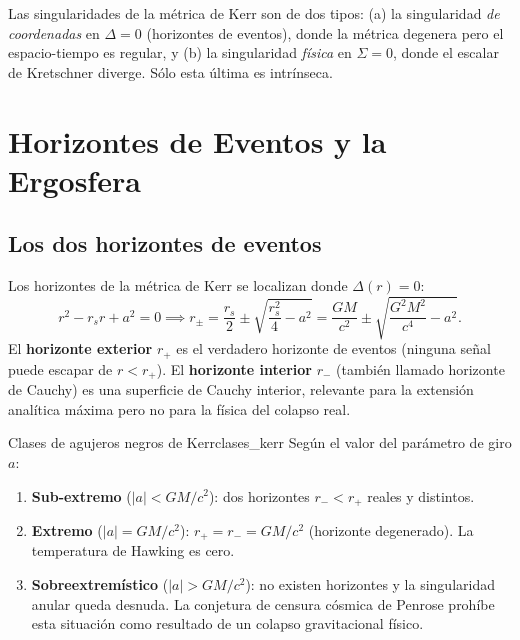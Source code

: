 \begin{importante}
Las singularidades de la métrica de Kerr son de dos tipos: (a) la singularidad \emph{de coordenadas} en $\Delta = 0$ (horizontes de eventos), donde la métrica degenera pero el espacio-tiempo es regular, y (b) la singularidad \emph{física} en $\Sigma = 0$, donde el escalar de Kretschner diverge. Sólo esta última es intrínseca.
\end{importante}

\section{Horizontes de Eventos y la Ergosfera}
\label{sec:horizontes_ergosfera}

\subsection{Los dos horizontes de eventos}

Los horizontes de la métrica de Kerr se localizan donde $\Delta(r) = 0$:
\begin{equation}
  r^2 - r_s r + a^2 = 0 \implies
  r_{\pm} = \frac{r_s}{2} \pm \sqrt{\frac{r_s^2}{4} - a^2}
           = \frac{GM}{c^2} \pm \sqrt{\frac{G^2M^2}{c^4} - a^2}.
  \label{eq:horizontes_kerr_cap8}
\end{equation}
El \textbf{horizonte exterior} $r_+$ es el verdadero horizonte de eventos (ninguna señal puede escapar de $r < r_+$). El \textbf{horizonte interior} $r_-$ (también llamado horizonte de Cauchy) es una superficie de Cauchy interior, relevante para la extensión analítica máxima pero no para la física del colapso real.

\begin{definicion}{Clases de agujeros negros de Kerr}{clases_kerr}
Según el valor del parámetro de giro $a$:
\begin{enumerate}[leftmargin=2em, label=\textbf{\arabic*.}]
  \item \textbf{Sub-extremo} ($|a| < GM/c^2$): dos horizontes $r_- < r_+$ reales y distintos.
  \item \textbf{Extremo} ($|a| = GM/c^2$): $r_+ = r_- = GM/c^2$ (horizonte degenerado). La temperatura de Hawking es cero.
  \item \textbf{Sobreextremístico} ($|a| > GM/c^2$): no existen horizontes y la singularidad anular queda desnuda. La conjetura de censura cósmica de Penrose prohíbe esta situación como resultado de un colapso gravitacional físico.
\end{enumerate}
\end{definicion}

